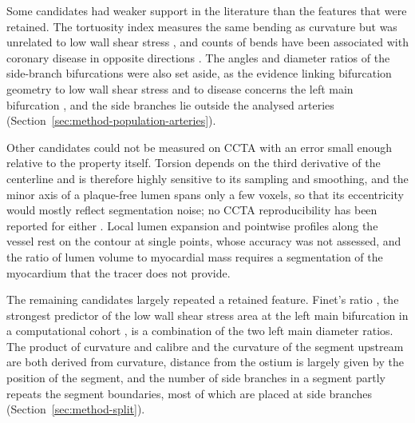 Some candidates had weaker support in the literature than the features that were retained.
The tortuosity index measures the same bending as curvature but was unrelated to low wall shear stress \cite{kashyap2022tortuosity}, and counts of bends have been associated with coronary disease in opposite directions \cite{groves2009tortuosity,li2011tortuosity,telloayala2026tortuosity}.
The angles and diameter ratios of the side-branch bifurcations were also set aside, as the evidence linking bifurcation geometry to low wall shear stress and to disease concerns the left main bifurcation \cite{cui2017bifurcation,garcha2025sensitivity,tommasino2024clap}, and the side branches lie outside the analysed arteries (Section~\ref{sec:method-population-arteries}).

Other candidates could not be measured on CCTA with an error small enough relative to the property itself.
Torsion depends on the third derivative of the centerline and is therefore highly sensitive to its sampling and smoothing, and the minor axis of a plaque-free lumen spans only a few voxels, so that its eccentricity would mostly reflect segmentation noise; no CCTA reproducibility has been reported for either .
Local lumen expansion and pointwise profiles along the vessel rest on the contour at single points, whose accuracy was not assessed, and the ratio of lumen volume to myocardial mass requires a segmentation of the myocardium that the tracer does not provide.

The remaining candidates largely repeated a retained feature.
Finet's ratio \cite{finet2008fractal}, the strongest predictor of the low wall shear stress area at the left main bifurcation in a computational cohort \cite{gharleghi2024leftmain}, is a combination of the two left main diameter ratios.
The product of curvature and calibre and the curvature of the segment upstream are both derived from curvature, distance from the ostium is largely given by the position of the segment, and the number of side branches in a segment partly repeats the segment boundaries, most of which are placed at side branches (Section~\ref{sec:method-split}).

